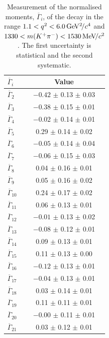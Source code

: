 \begin{table}[!tb]
\caption{Measurement of the normalised moments, $\overline{\Gamma}_{i}$, of the decay \BdToKpimm in the range $1.1<{q^2}<6.0{\mathrm{\,Ge\kern -0.1em V^2\!/}c^4}$ and $1330<m({{K}^+}{{\pi}^-})<1530{\mathrm{\,Me\kern -0.1em V\!/}c^2}$. The first uncertainty is statistical and the second systematic.}
\label{tab:results:moments}
\centering
\begin{tabular}{l|c}
$\overline{\Gamma}_{i}$ & Value \\ 
\hline
$\overline{\Gamma}_{2}$ & $-0.42$ $\pm$ 0.13 $\pm$ 0.03 \\ 
$\overline{\Gamma}_{3}$ & $-0.38$ $\pm$ 0.15 $\pm$ 0.01 \\ 
$\overline{\Gamma}_{4}$ & $-0.02$ $\pm$ 0.14 $\pm$ 0.01 \\ 
$\overline{\Gamma}_{5}$ & \hphantom{$-$}0.29 $\pm$ 0.14 $\pm$ 0.02 \\ 
$\overline{\Gamma}_{6}$ & $-0.05$ $\pm$ 0.14 $\pm$ 0.04 \\ 
$\overline{\Gamma}_{7}$ & $-0.06$ $\pm$ 0.15 $\pm$ 0.03 \\ 
$\overline{\Gamma}_{8}$ & \hphantom{$-$}0.04 $\pm$ 0.16 $\pm$ 0.01 \\ 
$\overline{\Gamma}_{9}$ & \hphantom{$-$}0.05 $\pm$ 0.16 $\pm$ 0.02 \\ 
$\overline{\Gamma}_{10}$ & \hphantom{$-$}0.24 $\pm$ 0.17 $\pm$ 0.02 \\ 
$\overline{\Gamma}_{11}$ & \hphantom{$-$}0.06 $\pm$ 0.13 $\pm$ 0.01 \\ 
$\overline{\Gamma}_{12}$ & $-0.01$ $\pm$ 0.13 $\pm$ 0.02 \\ 
$\overline{\Gamma}_{13}$ & $-0.08$ $\pm$ 0.12 $\pm$ 0.01 \\ 
$\overline{\Gamma}_{14}$ & \hphantom{$-$}0.09 $\pm$ 0.13 $\pm$ 0.01 \\ 
$\overline{\Gamma}_{15}$ & \hphantom{$-$}0.11 $\pm$ 0.13 $\pm$ 0.00 \\ 
$\overline{\Gamma}_{16}$ & $-0.12$ $\pm$ 0.13 $\pm$ 0.01 \\ 
$\overline{\Gamma}_{17}$ & $-0.04$ $\pm$ 0.13 $\pm$ 0.01 \\ 
$\overline{\Gamma}_{18}$ & \hphantom{$-$}0.03 $\pm$ 0.14 $\pm$ 0.01 \\ 
$\overline{\Gamma}_{19}$ & \hphantom{$-$}0.11 $\pm$ 0.11 $\pm$ 0.01 \\ 
$\overline{\Gamma}_{20}$ & $-0.00$ $\pm$ 0.11 $\pm$ 0.01 \\ 
$\overline{\Gamma}_{21}$ & \hphantom{$-$}0.03 $\pm$ 0.12 $\pm$ 0.01 \\ 
\end{tabular}

\end{table}
